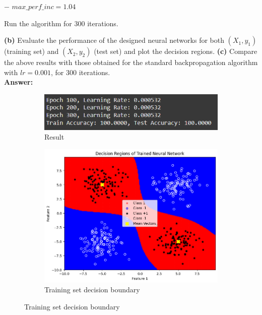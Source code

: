 \documentclass[a4paper,12pt]{article}
\begin{document}
\hspace{5mm} $-$ $max\_perf\_inc = 1.04$  

Run the algorithm for 300 iterations.

\textbf{(b)} Evaluate the performance of the designed neural networks for both $(X_1, y_1)$ (training set) and $(X_2, y_2)$ (test set) and plot the decision regions.
\textbf{(c)} Compare the above results with those obtained for the standard backpropagation algorithm with $lr = 0.001$, for 300 iterations.
\\
\textbf{Answer:}\\

\begin{figure}[H]
    \centering
    \captionsetup[subfigure]{list=true} %

    \begin{subfigure}{0.5\textwidth}
        \centering
        \includegraphics[width=\textwidth]{2.4_r.png}
        \caption{Result}
    \end{subfigure}
    \begin{subfigure}{0.45\textwidth}
        \centering
        \includegraphics[width=\textwidth]{2.4_Train.png}
        \caption{Training set decision boundary}
    \end{subfigure}


\end{figure}
\end{document}
